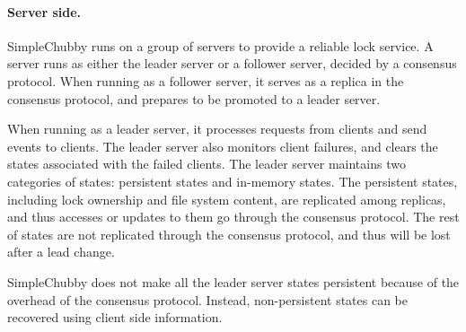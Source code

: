 \paragraph{Server side.}
SimpleChubby runs on a group of servers to provide a reliable lock service.
A server runs as either the leader server or a follower server,
decided by a consensus protocol.
When running as a follower server, it serves as a replica in the consensus
protocol, and prepares to be promoted to a leader server.

When running as a leader server, it processes requests from clients and send
events to clients.
The leader server also monitors client failures, and clears the states associated
with the failed clients.
The leader server maintains two categories of states: persistent states and
in-memory states.
The persistent states, including lock ownership and file system content,
are replicated among replicas, and thus accesses or updates to them go
through the consensus protocol.
The rest of states are not replicated through the consensus protocol,
and thus will be lost after a lead change.

SimpleChubby does not make all the leader server states persistent because
of the overhead of the consensus protocol.
Instead, non-persistent states can be recovered using client side information.
